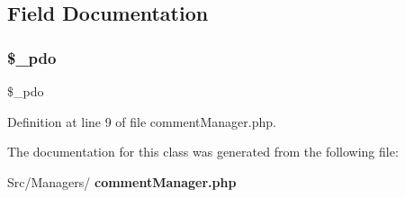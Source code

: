 \subsection{Field Documentation}
\mbox{\label{class_src_1_1_managers_1_1comment_manager_a1e6d977917b70dce7e26cebad8438bf4}} 
\subsubsection{\$\+\_\+pdo}
{\footnotesize\ttfamily \$\+\_\+pdo\hspace{0.3cm}{\ttfamily [protected]}}



Definition at line 9 of file comment\+Manager.\+php.



The documentation for this class was generated from the following file\+:\begin{DoxyCompactItemize}
\item 
Src/\+Managers/\textbf{ comment\+Manager.\+php}\end{DoxyCompactItemize}
